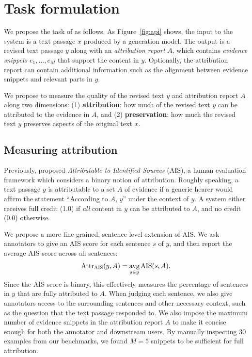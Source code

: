 
\section{Task formulation}\label{sec:task}

We propose the task of \textit{\taskName} as follows. As Figure~\ref{fig:api} shows, the input to the system is a text passage $x$ produced by a generation model. %
The output is a revised text passage $y$ along with an \emph{attribution report} $A$, which contains \emph{evidence snippets} $e_1, \dots, e_M$ that support the content in $y$.
Optionally, the attribution report can contain additional information such as the alignment between evidence snippets and relevant parts in $y$.

We propose to measure the quality of the revised text $y$ and attribution report $A$ along two dimensions: (1) \textbf{attribution}: how much of the revised text $y$ can be attributed to the evidence in $A$,
and (2) \textbf{preservation}: how much the revised text $y$ preserves aspects of the original text $x$.


\subsection{Measuring attribution}

Previously, \citet{Rashkin2021AIS} proposed \emph{Attributable to Identified Sources} (AIS), a human evaluation framework which considers a binary notion of attribution.
Roughly speaking, a text passage $y$ is attributable to a set $A$ of evidence if a generic hearer would affirm the statement ``According to $A$, $y$'' under the context of $y$.
A system either receives full credit (1.0) if \emph{all} content in $y$ can be attributed to $A$, and no credit (0.0) otherwise.

We propose a more fine-grained, sentence-level extension of AIS.
We ask annotators to give an AIS score for each sentence $s$ of $y$, and then report the average AIS score across all sentences:
\begin{equation}
\text{Attr}_\text{AIS}(y, A) = \operatorname*{avg}_{s \in y} \text{AIS}(s, A).
\end{equation}
Since the AIS score is binary, this effectively measures the percentage of sentences in $y$ that are fully attributed to $A$. When judging each sentence, we also give annotators access to the surrounding sentences and other necessary context, such as the question that the text passage responded to.
We also impose the maximum number of evidence snippets in the attribution report $A$
to make it concise enough for both the annotator and downstream users.
By manually inspecting 30 examples from our benchmarks,
we found $M = 5$ snippets to be sufficient for full attribution.

